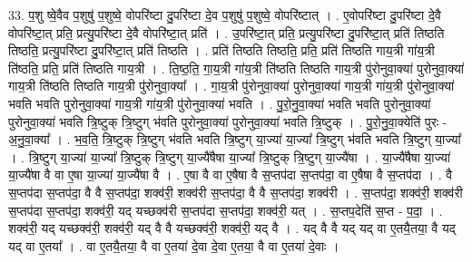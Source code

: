 \documentclass[17pt]{extarticle}
\begin{document}
33. प॒शु ष्वे॒वैव प॒शुषु॑ प॒शुष्वे॒ वोपरि॑ष्टा दु॒परि॑ष्टा दे॒व प॒शुषु॑ प॒शुष्वे॒ वोपरि॑ष्टात् । . ए॒वोपरि॑ष्टा दु॒परि॑ष्टा दे॒वै वोपरि॑ष्टा॒त् प्रति॒ प्रत्यु॒परि॑ष्टा दे॒वै वोपरि॑ष्टा॒त् प्रति॑ । . उ॒परि॑ष्टा॒त् प्रति॒ प्रत्यु॒परि॑ष्टा दु॒परि॑ष्टा॒त् प्रति॑ तिष्ठति तिष्ठति॒ प्रत्यु॒परि॑ष्टा दु॒परि॑ष्टा॒त् प्रति॑ तिष्ठति । . प्रति॑ तिष्ठति तिष्ठति॒ प्रति॒ प्रति॑ तिष्ठति गाय॒त्री गा॑य॒त्री ति॑ष्ठति॒ प्रति॒ प्रति॑ तिष्ठति गाय॒त्री । . ति॒ष्ठ॒ति॒ गा॒य॒त्री गा॑य॒त्री ति॑ष्ठति तिष्ठति गाय॒त्री पु॑रोनुवा॒क्या॑ पुरोनुवा॒क्या॑ गाय॒त्री ति॑ष्ठति तिष्ठति गाय॒त्री पु॑रोनुवा॒क्या᳚ । . गा॒य॒त्री पु॑रोनुवा॒क्या॑ पुरोनुवा॒क्या॑ गाय॒त्री गा॑य॒त्री पु॑रोनुवा॒क्या॑ भवति भवति पुरोनुवा॒क्या॑ गाय॒त्री गा॑य॒त्री पु॑रोनुवा॒क्या॑ भवति । . पु॒रो॒नु॒वा॒क्या॑ भवति भवति पुरोनुवा॒क्या॑ पुरोनुवा॒क्या॑ भवति त्रि॒ष्टुक् त्रि॒ष्टुग् भ॑वति पुरोनुवा॒क्या॑ पुरोनुवा॒क्या॑ भवति त्रि॒ष्टुक् । . पु॒रो॒नु॒वा॒क्येति॑ पुरः - अ॒नु॒वा॒क्या᳚ । . भ॒व॒ति॒ त्रि॒ष्टुक् त्रि॒ष्टुग् भ॑वति भवति त्रि॒ष्टुग् या॒ज्या॑ या॒ज्या᳚ त्रि॒ष्टुग् भ॑वति भवति त्रि॒ष्टुग् या॒ज्या᳚ । . त्रि॒ष्टुग् या॒ज्या॑ या॒ज्या᳚ त्रि॒ष्टुक् त्रि॒ष्टुग् या॒ज्यै॑षैषा या॒ज्या᳚ त्रि॒ष्टुक् त्रि॒ष्टुग् या॒ज्यै॑षा । . या॒ज्यै॑षैषा या॒ज्या॑ या॒ज्यै॑षा वै वा ए॒षा या॒ज्या॑ या॒ज्यै॑षा वै । . ए॒षा वै वा ए॒षैषा वै स॒प्तप॑दा स॒प्तप॑दा॒ वा ए॒षैषा वै स॒प्तप॑दा । . वै स॒प्तप॑दा स॒प्तप॑दा॒ वै वै स॒प्तप॑दा॒ शक्व॑री॒ शक्व॑री स॒प्तप॑दा॒ वै वै स॒प्तप॑दा॒ शक्व॑री । . स॒प्तप॑दा॒ शक्व॑री॒ शक्व॑री स॒प्तप॑दा स॒प्तप॑दा॒ शक्व॑री॒ यद् यच्छक्व॑री स॒प्तप॑दा स॒प्तप॑दा॒ शक्व॑री॒ यत् । . स॒प्तप॒देति॑ स॒प्त - प॒दा॒ । . शक्व॑री॒ यद् यच्छक्व॑री॒ शक्व॑री॒ यद् वै वै यच्छक्व॑री॒ शक्व॑री॒ यद् वै । . यद् वै वै यद् यद् वा ए॒तयै॒तया॒ वै यद् यद् वा ए॒तया᳚ । . वा ए॒तयै॒तया॒ वै वा ए॒तया॑ दे॒वा दे॒वा ए॒तया॒ वै वा ए॒तया॑ दे॒वाः । \newline
\end{document}
